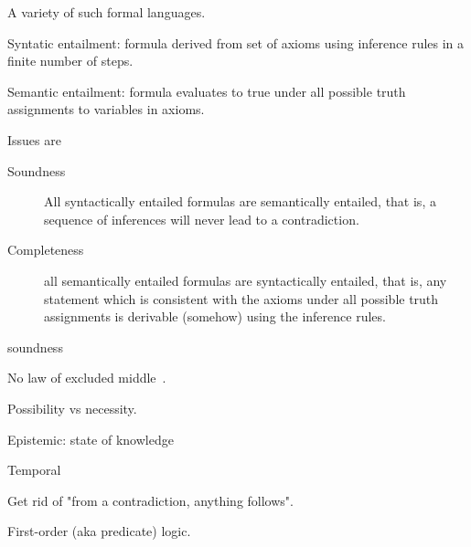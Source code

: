 A variety of such formal languages.

Syntatic entailment: formula derived from set of axioms 
using inference rules in a finite number of steps.

Semantic entailment: formula evaluates to \textsf{true}
under all possible truth assignments to variables
in axioms.

Issues are 
\begin{description}
\item[Soundness]
All syntactically entailed formulas
are semantically entailed, that is,
a sequence of inferences will never lead to a contradiction.

\item[Completeness] 
all semantically entailed formulas 
are syntactically entailed, that is,
any statement which is consistent with the axioms under all 
possible truth assignments is derivable (somehow) using the 
inference rules.
\end{description}soundness 

\label{sec:Intuitionist_zeroth_order_logic}

\cite{wiki:Intuitionistic_logic}

No law of excluded middle~\cite{wiki:Law_of_excluded_middle}.

\label{sec:Modal_logic}

\cite{wiki:Modal_logic}

Possibility vs necessity.

Epistemic: state of knowledge

Temporal 

\label{sec:Paraconsistent_logic}

\cite{wiki:Paraconsistent_logic}

Get rid of "from a contradiction, anything follows".
\label{sec:First_order_logic}

First-order (aka predicate) logic.~\cite{wiki:First_order_logic,
sep:logic_firstorder_emergence}

